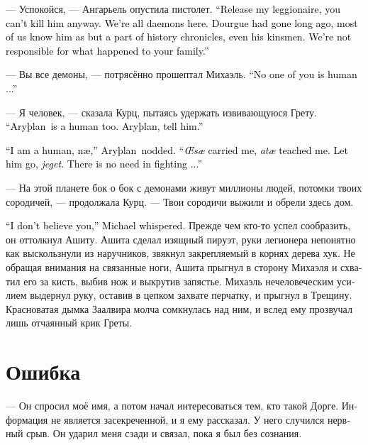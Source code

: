 \documentclass[a4paper,12pt,fleqn]{book}\usepackage{cooltooltips}\usepackage{polyglossia}\setdefaultlanguage[babelshorthands=true]{russian}\setotherlanguage{english}\defaultfontfeatures{Ligatures=TeX,Mapping=tex-text} \usepackage{xcolor}\definecolor{lightgray}{HTML}{bbbbbb}\color{lightgray}\newcommand{\ml}[3]{\textenglish{\textcolor{black}{#3}}}
\newcommand{\Arythlan}{Aryþlan}
\begin{document}
--- Успокойся, --- Ангарьель опустила пистолет.
\ml{$0$}
{--- Отпусти моего легионера, ты всё равно не сможешь его убить.}
{``Release my leggionaire, you can't kill him anyway.}
\ml{$0$}
{Мы все здесь демоны.}
{We're all daemons here.}
\ml{$0$}
{Дорге давно уже нет в живых, многие из нас знают о нём лишь из исторических хроник, даже члены его клана.}
{Dourgue had gone long ago, most of us know him as but a part of history chronicles, even his kinsmen.}
\ml{$0$}
{Мы не виноваты в том, что случилось с твоей семьёй.}
{We're not responsible for what happened to your family.''}

--- Вы все демоны, --- потрясённо прошептал Михаэль.
\ml{$0$}
{--- Никто из вас не человек...}
{``No one of you is human ...''}

--- Я человек, --- сказала Курц, пытаясь удержать извивающуюся Грету.
\ml{$0$}
{--- Арслан --- тоже человек.}
{``\Arythlan\ is a human too.}
\ml{$0$}
{Арслан, скажи ему.}
{\Arythlan, tell him.''}

\ml{$0$}
{--- Я человек, нэй, --- закивал Арслан.}
{``I am a human, n\ae{},'' \Arythlan\ nodded.}
\ml{$0$}
{--- Меня эсей выносила, атай воспитал.}
{``\textit{\OE{}s\ae{}} carried me, \textit{at\ae{}} teached me.}
\ml{$0$}
{Отпусти его, егет.}
{Let him go, \textit{jeget}.}
\ml{$0$}
{Не надо драться...}
{There is no need in fighting ...''}

--- На этой планете бок о бок с демонами живут миллионы людей, потомки твоих сородичей, --- продолжала Курц.
--- Твои сородичи выжили и обрели здесь дом.

\ml{$0$}
{--- Я тебе не верю, --- прошептал Михаэль.}
{``I don't believe you,'' Michael whispered.}
Прежде чем кто-то успел сообразить, он оттолкнул Ашиту.
Ашита сделал изящный пируэт, руки легионера непонятно как выскользнули из наручников, звякнул закрепляемый в корнях дерева хук.
Не обращая внимания на связанные ноги, Ашита прыгнул в сторону Михаэля и схватил его за кисть, выбив нож и выкрутив запястье.
Михаэль нечеловеческим усилием выдернул руку, оставив в цепком захвате перчатку, и прыгнул в Трещину.
Красноватая дымка Заалвира молча сомкнулась над ним, и вслед ему прозвучал лишь отчаянный крик Греты.

\section{Ошибка}

--- Он спросил моё имя, а потом начал интересоваться тем, кто такой Дорге.
Информация не является засекреченной, и я ему рассказал.
У него случился нервный срыв.
Он ударил меня сзади и связал, пока я был без сознания.
\end{document}
